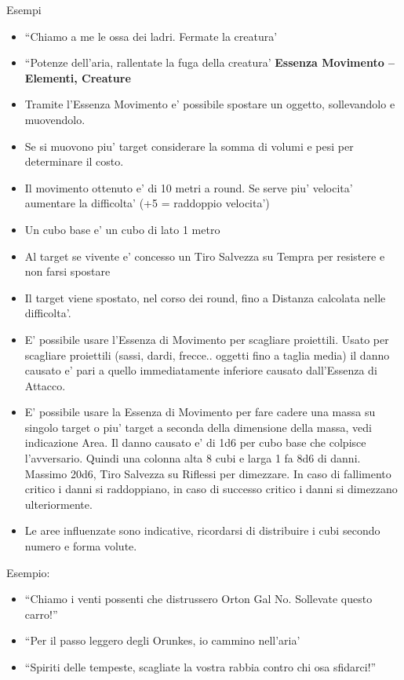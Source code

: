 \documentclass[a4paper,11pt,twoside,openany]{dndbook}
\begin{document}
Esempi
\begin{itemize}
	\item 
	``Chiamo a me le ossa dei ladri. Fermate la creatura' 
	\item 
	``Potenze dell'aria, rallentate la fuga della creatura' 
	\textbf{Essenza Movimento -- Elementi, Creature}
	\item 
	Tramite l'Essenza Movimento e' possibile spostare un oggetto, sollevandolo e muovendolo. 
	\item 
	Se si muovono piu' target considerare la somma di volumi e pesi per determinare il costo. 
	\item 
	Il movimento ottenuto e' di 10 metri a round. Se serve piu' velocita' aumentare la difficolta' (+5 = raddoppio velocita') 
	\item 
	Un cubo base e' un cubo di lato 1 metro 
	\item 
	Al target se vivente e' concesso un Tiro Salvezza su Tempra per resistere e non farsi spostare 
	\item 
	Il target viene spostato, nel corso dei round, fino a Distanza calcolata nelle difficolta'. 
	\item 
	E' possibile usare l'Essenza di Movimento per scagliare proiettili. Usato per scagliare proiettili (sassi, dardi, frecce.. oggetti fino a taglia media) il danno causato e' pari a quello immediatamente inferiore causato dall'Essenza di Attacco. 
	\item 
	E' possibile usare la Essenza di Movimento per fare cadere una massa su singolo target o piu' target a seconda della dimensione della massa, vedi indicazione Area. Il danno causato e' di 1d6 per cubo base che colpisce l'avversario. Quindi una colonna alta 8 cubi e larga 1 fa 8d6 di danni. Massimo 20d6, Tiro Salvezza su Riflessi per dimezzare. In caso di fallimento critico i danni si raddoppiano, in caso di successo critico i danni si dimezzano ulteriormente. 
	\item 
	Le aree influenzate sono indicative, ricordarsi di distribuire i cubi secondo numero e forma volute. 
\end{itemize}
\bigskip


Esempio:
\begin{itemize}
\item 
``Chiamo i venti possenti che distrussero Orton Gal No. Sollevate questo carro!'' 
\item 
``Per il passo leggero degli Orunkes, io cammino nell'aria' 
\item 
``Spiriti delle tempeste, scagliate la vostra rabbia contro chi osa sfidarci!'' 
\end{itemize}
\end{document}
